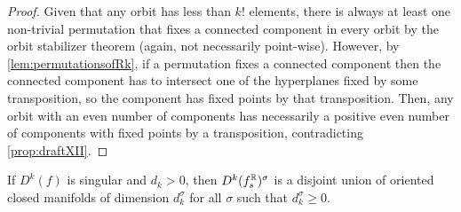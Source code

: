 \documentclass[a4paper,12pt]{amsart}
\begin{document}
\begin{proof}
Given that any orbit has less than $k!$ elements, there is always at least one non-trivial permutation that fixes a connected component in every orbit by the orbit stabilizer theorem (again, not necessarily point-wise).  However, by \cref{lem:permutationsofRk}, if a permutation fixes a connected component then the connected component has to intersect one of the hyperplanes fixed by some transposition, so the component has fixed points by that transposition. Then, any orbit with an even number of components has necessarily a positive even number of components with fixed points by a transposition, contradicting \cref{prop:draftXII}.
\end{proof}


\begin{theorem}\label{lem:manifold}
If $D^k(f)$ is singular and $d_k>0$, then $D^k(f_s^{\mathbb{R}})^\sigma$ is a disjoint union of oriented closed manifolds of dimension $d_k^\sigma$ for all $\sigma$ such that $d_k^\sigma\geq0$.
\end{theorem}
\end{document}
